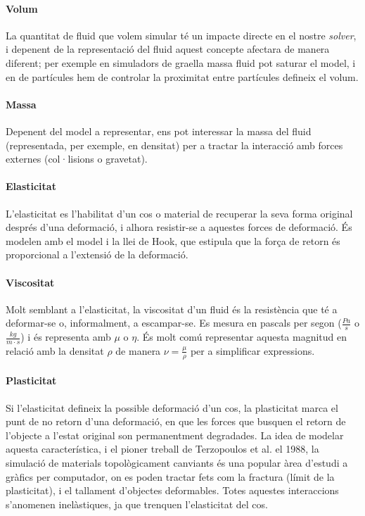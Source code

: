 \documentclass[a4paper]{report}
\begin{document}
	\paragraph{Volum} La quantitat de fluid que volem simular té un impacte directe en el nostre \textit{solver}, i depenent de la representació del fluid aquest concepte afectara de manera diferent; per exemple en simuladors de graella massa fluid pot saturar el model, i en de partícules hem de controlar la proximitat entre partícules defineix el volum. 
	\paragraph{Massa} Depenent del model a representar, ens pot interessar la massa del fluid (representada, per exemple, en densitat) per a tractar la interacció amb forces externes (col·lisions o gravetat).
	\paragraph{Elasticitat} L'elasticitat es l'habilitat d'un cos o material de recuperar la seva forma original després d'una deformació, i alhora resistir-se a aquestes forces de deformació. És modelen amb el model i la llei de Hook, que estipula que la força de retorn és proporcional a l'extensió de la deformació.
	\paragraph{Viscositat} Molt semblant a l'elasticitat, la viscositat d'un fluid és la resistència que té a deformar-se o, informalment, a escampar-se. Es mesura en pascals per segon ($\frac{Pa}{s}$ o $\frac{kg}{m \cdot s}$) i és representa amb $\mu$ o $\eta$. És molt comú representar aquesta magnitud en relació amb la densitat $\rho$ de manera $\nu = \frac{\mu}{\rho}$ per a simplificar expressions.
	\paragraph{Plasticitat} Si l'elasticitat defineix la possible deformació d'un cos, la plasticitat marca el punt de no retorn d'una deformació, en que les forces que busquen el retorn de l'objecte a l'estat original son permanentment degradades. La idea de modelar aquesta característica, i el pioner treball de Terzopoulos et al. \cite{Terzopoulos:1988:MID:378456.378522} el 1988, la simulació de materials topològicament canviants és una popular àrea d'estudi a gràfics per computador, on es poden tractar fets com la fractura (límit de la plasticitat), i el tallament d'objectes deformables. Totes aquestes interaccions s'anomenen inelàstiques, ja que trenquen l'elasticitat del cos.
\end{document}
